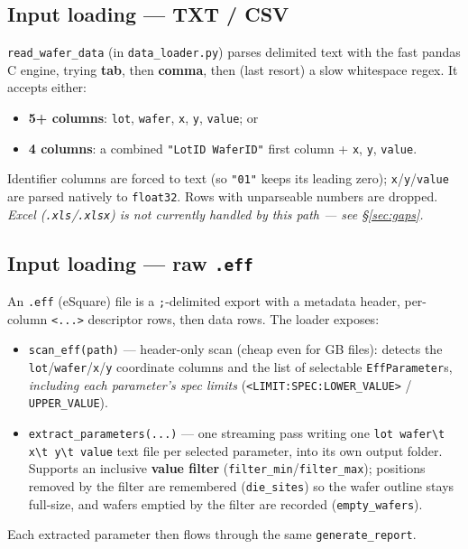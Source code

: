 \documentclass[11pt,a4paper]{article}
\newcommand{\code}[1]{\texttt{#1}}
\begin{document}
\subsection{Input loading --- TXT / CSV}
\code{read_wafer_data} (in \texttt{data\_loader.py}) parses delimited text with
the fast pandas C engine, trying \textbf{tab}, then \textbf{comma}, then (last
resort) a slow whitespace regex. It accepts either:
\begin{itemize}[nosep,leftmargin=1.4em]
\item \textbf{5+ columns}: \code{lot}, \code{wafer}, \code{x}, \code{y}, \code{value}; or
\item \textbf{4 columns}: a combined \code{"LotID WaferID"} first column + \code{x}, \code{y}, \code{value}.
\end{itemize}
Identifier columns are forced to text (so \code{"01"} keeps its leading zero);
\code{x}/\code{y}/\code{value} are parsed natively to \code{float32}. Rows with
unparseable numbers are dropped. \emph{Excel (\texttt{.xls}/\texttt{.xlsx}) is
not currently handled by this path --- see \S\ref{sec:gaps}.}

\subsection{Input loading --- raw \texttt{.eff}}
An \texttt{.eff} (eSquare) file is a \texttt{;}-delimited export with a metadata
header, per-column \texttt{<...>} descriptor rows, then data rows. The loader
exposes:
\begin{itemize}[nosep,leftmargin=1.4em]
\item \code{scan_eff(path)} --- header-only scan (cheap even for GB files): detects the
\code{lot}/\code{wafer}/\code{x}/\code{y} coordinate columns and the list of
selectable \code{EffParameter}s, \emph{including each parameter's spec limits}
(\code{<LIMIT:SPEC:LOWER_VALUE>} / \code{UPPER_VALUE}).
\item \code{extract_parameters(...)} --- one streaming pass writing one
\code{lot wafer\textbackslash t x\textbackslash t y\textbackslash t value} text file per selected parameter,
into its own output folder. Supports an inclusive \textbf{value filter}
(\code{filter_min}/\code{filter_max}); positions removed by the filter are
remembered (\code{die_sites}) so the wafer outline stays full-size, and wafers
emptied by the filter are recorded (\code{empty_wafers}).
\end{itemize}
Each extracted parameter then flows through the same \code{generate_report}.
\end{document}
